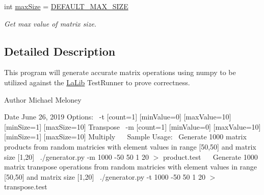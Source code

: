 \begin{DoxyCompactItemize}
\mbox{\label{namespacegenerator_ab7b0710a2df070c675c125365275a243}} 
int \mbox{\hyperlink{namespacegenerator_ab7b0710a2df070c675c125365275a243}{max\+Size}} = \mbox{\hyperlink{namespacegenerator_ab7780beb5ea70ea98b607e0cbc6f7fdd}{D\+E\+F\+A\+U\+L\+T\+\_\+\+M\+A\+X\+\_\+\+S\+I\+ZE}}
\begin{DoxyCompactList}\small\item\em Get max value of matrix size. \end{DoxyCompactList}\end{DoxyCompactItemize}


\subsection{Detailed Description}
This program will generate accurate matrix operations using numpy to be utilized against the \mbox{\hyperlink{namespaceLaLib}{La\+Lib}} Test\+Runner to prove correctness. 

\begin{DoxyAuthor}{Author}
Michael Meloney 
\end{DoxyAuthor}
\begin{DoxyDate}{Date}
June 26, 2019 Options\+:~\newline
 -\/t \mbox{[}count=1\mbox{]} \mbox{[}min\+Value=0\mbox{]} \mbox{[}max\+Value=10\mbox{]} \mbox{[}min\+Size=1\mbox{]} \mbox{[}max\+Size=10\mbox{]} Transpose~\newline
 -\/m \mbox{[}count=1\mbox{]} \mbox{[}min\+Value=0\mbox{]} \mbox{[}max\+Value=10\mbox{]} \mbox{[}min\+Size=1\mbox{]} \mbox{[}max\+Size=10\mbox{]} Multiply~\newline
~\newline
 Sample Usage\+:~\newline
 Generate 1000 matrix products from random matricies with element values in range \mbox{[}50,50\mbox{]} and matrix size \mbox{[}1,20\mbox{]}~\newline
 ./generator.py -\/m 1000 -\/50 50 1 20 $>$ product.\+test~\newline
~\newline
 Generate 1000 matrix transpose operations from random matricies with element values in range \mbox{[}50,50\mbox{]} and matrix size \mbox{[}1,20\mbox{]}~\newline
 ./generator.py -\/t 1000 -\/50 50 1 20 $>$ transpose.\+test 
\end{DoxyDate}
